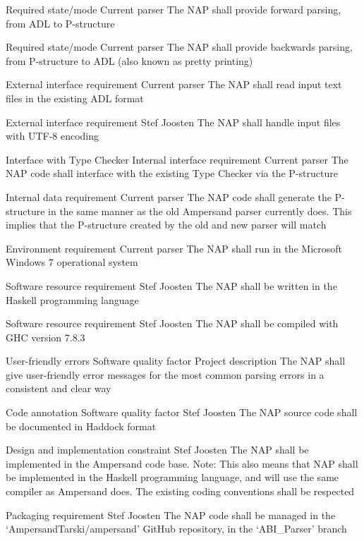 		{Required state/mode}
		{Current parser}
		{The NAP shall provide forward parsing, from ADL to P-structure}
	
		{Required state/mode}
		{Current parser}
		{The NAP shall provide backwards parsing, from P-structure to ADL (also known as pretty printing)}

		{External interface requirement}
		{Current parser}
		{The NAP shall read input text files in the existing ADL format}

		{External interface requirement}
		{Stef Joosten}
		{The NAP shall handle input files with UTF-8 encoding}

		{Interface with Type Checker}
		{Internal interface requirement}
		{Current parser}
		{The NAP code shall interface with the existing Type Checker via the P-structure}

		{Internal data requirement}
		{Current parser}
		{The NAP code shall generate the P-structure in the same manner as the old Ampersand parser currently does.
		This implies that the P-structure created by the old and new parser will match}

		{Environment requirement}
		{Current parser}
		{The NAP shall run in the Microsoft Windows 7 operational system}

		{Software resource requirement}
		{Stef Joosten}
		{The NAP shall be written in the Haskell programming language}
		
		{Software resource requirement}
		{Stef Joosten}
		{The NAP shall be compiled with GHC version 7.8.3}

		{User-friendly errors}
		{Software quality factor}
		{Project description}
		{The NAP shall give user-friendly error messages for the most common parsing errors in a consistent and clear way}

		{Code annotation}
		{Software quality factor}
		{Stef Joosten}
		{The NAP source code shall be documented in Haddock format}

		{Design and implementation constraint}
		{Stef Joosten}
		{The NAP shall be implemented in the Ampersand code base.\newline
		Note: This also means that NAP shall be implemented in the Haskell programming language, and will use the same compiler as Ampersand does.
		The existing coding conventions shall be respected}

		{Packaging requirement}
		{Stef Joosten}
		{The NAP code shall be managed in the `AmpersandTarski/ampersand' GitHub repository, in the `ABI\_Parser' branch}
